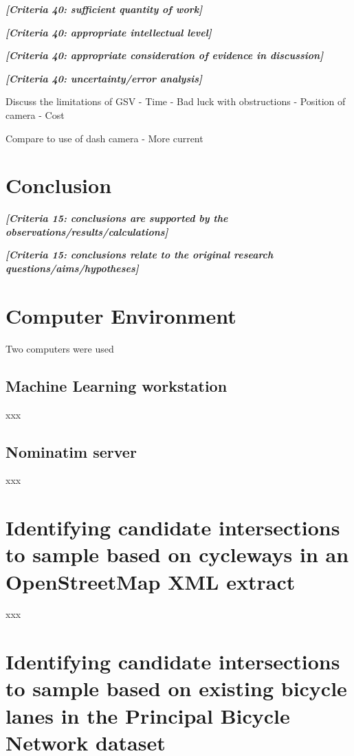 \documentclass[11pt,twoside]{report}
\newcommand{\remark}[1]{{\bf \em [\marginpar{$\Leftarrow$}#1]}}
\begin{document}
\remark{Criteria 40: sufficient quantity of work}

\remark{Criteria 40: appropriate intellectual level}

\remark{Criteria 40: appropriate consideration of evidence in discussion}

\remark{Criteria 40: uncertainty/error analysis}

Discuss the limitations of GSV
- Time
- Bad luck with obstructions
- Position of camera
- Cost

Compare to use of dash camera
- More current

\chapter{Conclusion}

\remark{Criteria 15: conclusions are supported by the observations/results/calculations}

\remark{Criteria 15: conclusions relate to the original research questions/aims/hypotheses}

\appendix
\chapter{Computer Environment}
\label{a:environment}

Two computers were used

\section{Machine Learning workstation}
\label{a:computer}

xxx

\section{Nominatim server}
\label{a:nominatim}

xxx

\chapter{Identifying candidate intersections to sample based on cycleways in an OpenStreetMap XML extract}
\label{a:sample_osm}

xxx

\chapter{Identifying candidate intersections to sample based on existing bicycle lanes in the Principal Bicycle Network dataset}
\label{a:sample_pbn}
\end{document}
